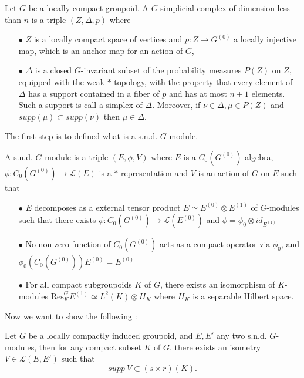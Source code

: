 \begin{definition}
Let $G$ be a locally compact groupoid. A $G$-simplicial complex of dimension less than $n$ is a triple $(Z,\Delta, p)$ where
\begin{itemize}
\item[$\bullet$] $Z$ is a locally compact space of vertices and $p: Z \rightarrow G^{(0)}$ a locally injective map, which is an anchor map for an action of $G$, 
\item[$\bullet$] $\Delta$ is a closed $G$-invariant subset of the probability measures $P(Z)$ on $Z$, equipped with the weak-$*$ topology, with the property that every element of $\Delta$ has a support contained in a fiber of $p$ and has at most $n+1$ elements. Such a support is call a simplex of $\Delta$. Moreover, if $\nu\in \Delta,\mu \in P(Z)$ and $supp(\mu)\subset supp(\nu)$ then $\mu\in \Delta$.
\end{itemize}
\end{definition}

The first step is to defined what is a s.n.d. $G$-module.

\begin{definition}
A s.n.d. $G$-module is a triple $(E,\phi,V)$ where $E$ is a $C_0(G^{(0)})$-algebra, $\phi : C_0(G^{(0)})\rightarrow \mathcal L(E)$ is a $*$-representation and $V$ is an action of $G$ on $E$ such that
\begin{itemize}
\item[$\bullet$] $E$ decomposes as a external tensor product $E\simeq E^{(0)}\otimes E^{(1)}$ of $G$-modules such that there exists $\phi : C_0(G^{(0)})\rightarrow \mathcal L(E^{(0)})$ and $\phi= \phi_0\otimes id_{E^{(1)}}$
\item[$\bullet$] No non-zero function of $C_0(G^{(0)})$ acts as a compact operator via $\phi_0$, and $\overline{\phi_0(C_0(G^{(0)}))E^{(0)} }= E^{(0)}$
\item[$\bullet$] For all compact subgroupoids $K$ of $G$, there exists an isomorphism of $K$-modules $\text{Res}_K^G E^{(1)} \simeq L^2(K)\otimes H_K$ where $H_K$ is a separable Hilbert space.
\end{itemize}
\end{definition}

Now we want to show the following :

\begin{lem}
Let $G$ be a locally compactly induced groupoid, and $E,E'$ any two s.n.d. $G$-modules, then for any compact subset $K$ of $G$, there exists an isometry $V\in \mathcal L(E,E')$ such that 
\[supp\ V \subset (s\times r)(K). \]
\end{lem}

